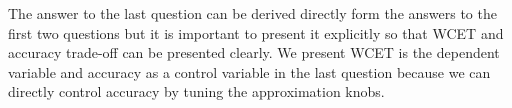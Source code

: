 The answer to the last question can be derived directly form the answers to the first two questions but it is important to present it explicitly so that WCET and accuracy trade-off can be presented clearly. We present WCET is the dependent variable and accuracy as a control variable in the last question because we can directly control accuracy by tuning the approximation knobs.

